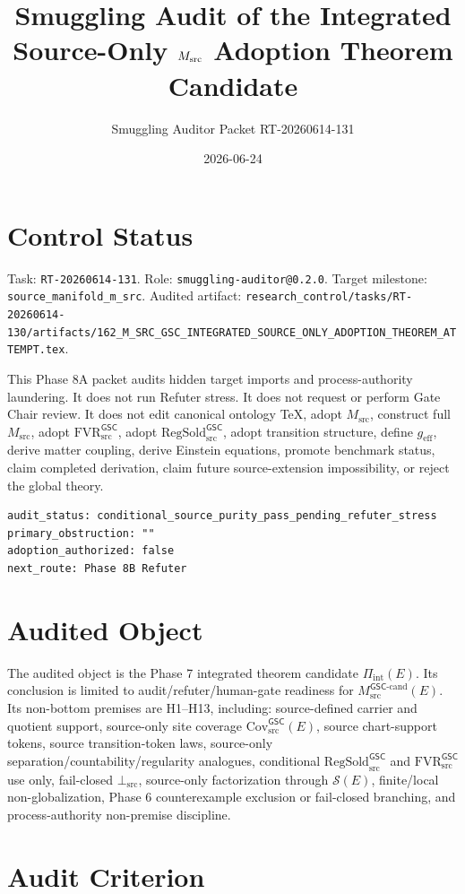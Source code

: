 \documentclass[11pt]{article}
\title{Smuggling Audit of the Integrated Source-Only \(\Msrc\) Adoption Theorem Candidate}
\author{Smuggling Auditor Packet RT-20260614-131}
\date{2026-06-24}
\newcommand{\Msrc}{M_{\mathrm{src}}}
\newcommand{\Mgsccand}{M_{\mathrm{src}}^{\mathsf{GSC}\mbox{-}\mathrm{cand}}}
\newcommand{\RegSold}{\mathrm{RegSold}_{\mathrm{src}}^{\mathsf{GSC}}}
\newcommand{\FVR}{\mathrm{FVR}_{\mathrm{src}}^{\mathsf{GSC}}}
\newcommand{\BottomSrc}{\bot_{\mathrm{src}}}
\newcommand{\CovSrc}{\mathrm{Cov}_{\mathrm{src}}^{\mathsf{GSC}}}
\newcommand{\SourceData}{\mathcal{S}(E)}
\begin{document}
\maketitle

\section{Control Status}

Task: \texttt{RT-20260614-131}. Role:
\texttt{smuggling-auditor@0.2.0}. Target milestone:
\texttt{source\_manifold\_m\_src}. Audited artifact:
\texttt{research\_control/tasks/RT-20260614-130/artifacts/162\_M\_SRC\_GSC\_INTEGRATED\_SOURCE\_ONLY\_ADOPTION\_THEOREM\_ATTEMPT.tex}.

This Phase 8A packet audits hidden target imports and process-authority
laundering. It does not run Refuter stress. It does not request or perform
Gate Chair review. It does not edit canonical ontology TeX, adopt \(\Msrc\),
construct full \(\Msrc\), adopt \(\FVR\), adopt \(\RegSold\), adopt transition
structure, define \(g_{\mathrm{eff}}\), derive matter coupling, derive
Einstein equations, promote benchmark status, claim completed derivation, claim
future source-extension impossibility, or reject the global theory.

\begin{verbatim}
audit_status: conditional_source_purity_pass_pending_refuter_stress
primary_obstruction: ""
adoption_authorized: false
next_route: Phase 8B Refuter
\end{verbatim}

\section{Audited Object}

The audited object is the Phase 7 integrated theorem candidate
\(\Pi_{\mathrm{int}}(E)\). Its conclusion is limited to audit/refuter/human-gate
readiness for \(\Mgsccand(E)\). Its non-bottom premises are H1--H13, including:
source-defined carrier and quotient support, source-only site coverage
\(\CovSrc(E)\), source chart-support tokens, source transition-token laws,
source-only separation/countability/regularity analogues, conditional
\(\RegSold\) and \(\FVR\) use only, fail-closed \(\BottomSrc\), source-only
factorization through \(\SourceData\), finite/local non-globalization, Phase 6
counterexample exclusion or fail-closed branching, and process-authority
non-premise discipline.

\section{Audit Criterion}
\end{document}
